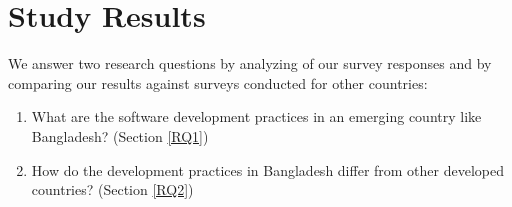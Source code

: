 \section{Study Results}
\label{study_results}
We answer two research questions by analyzing of our survey responses and by comparing our results against surveys conducted for other countries:
\begin{enumerate}[label=RQ\arabic{*}., leftmargin=26pt]
  \item What are the software development practices in an emerging country like Bangladesh? (Section \ref{RQ1})
  \item How do the development practices in Bangladesh differ from other developed countries? (Section \ref{RQ2})
\end{enumerate}

